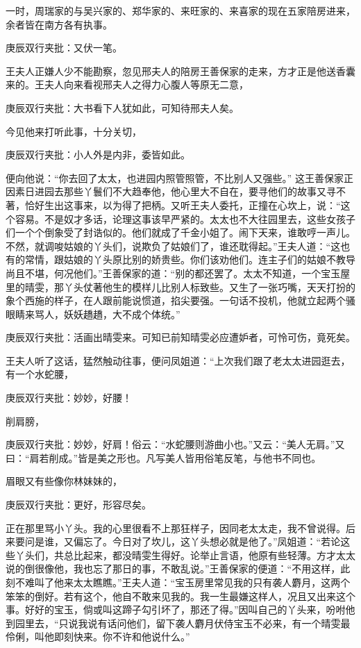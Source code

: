 \begin{parag}


    一时，周瑞家的与吴兴家的、郑华家的、来旺家的、来喜家的现在五家陪房进来，余者皆在南方各有执事。\begin{note}庚辰双行夹批：又伏一笔。\end{note}王夫人正嫌人少不能勘察，忽见邢夫人的陪房王善保家的走来，方才正是他送香囊来的。王夫人向来看视邢夫人之得力心腹人等原无二意，\begin{note}庚辰双行夹批：大书看下人犹如此，可知待邢夫人矣。\end{note}今见他来打听此事，十分关切，\begin{note}庚辰双行夹批：小人外是内非，委皆如此。\end{note}便向他说：“你去回了太太，也进园内照管照管，不比别人又强些。” 这王善保家正因素日进园去那些丫鬟们不大趋奉他，他心里大不自在，要寻他们的故事又寻不著，恰好生出这事来，以为得了把柄。又听王夫人委托，正撞在心坎上，说：“这个容易。不是奴才多话，论理这事该早严紧的。太太也不大往园里去，这些女孩子们一个个倒象受了封诰似的。他们就成了千金小姐了。闹下天来，谁敢哼一声儿。不然，就调唆姑娘的丫头们，说欺负了姑娘们了，谁还耽得起。”王夫人道：“这也有的常情，跟姑娘的丫头原比别的娇贵些。你们该劝他们。连主子们的姑娘不教导尚且不堪，何况他们。”王善保家的道：“别的都还罢了。太太不知道，一个宝玉屋里的晴雯，那丫头仗著他生的模样儿比别人标致些。又生了一张巧嘴，天天打扮的象个西施的样子，在人跟前能说惯道，掐尖要强。一句话不投机，他就立起两个骚眼睛来骂人，妖妖趫趫，大不成个体统。”\begin{note}庚辰双行夹批：活画出晴雯来。可知已前知晴雯必应遭妒者，可怜可伤，竟死矣。\end{note}王夫人听了这话，猛然触动往事，便问凤姐道：“上次我们跟了老太太进园逛去，有一个水蛇腰，\begin{note}庚辰双行夹批：妙妙，好腰！\end{note}削肩膀，\begin{note}庚辰双行夹批：妙妙，好肩！俗云：“水蛇腰则游曲小也。”又云：“美人无肩。”又曰：“肩若削成。”皆是美之形也。凡写美人皆用俗笔反笔，与他书不同也。\end{note}眉眼又有些像你林妹妹的，\begin{note}庚辰双行夹批：更好，形容尽矣。\end{note}正在那里骂小丫头。我的心里很看不上那狂样子，因同老太太走，我不曾说得。后来要问是谁，又偏忘了。今日对了坎儿，这丫头想必就是他了。”凤姐道：“若论这些丫头们，共总比起来，都没晴雯生得好。论举止言语，他原有些轻薄。方才太太说的倒很像他，我也忘了那日的事，不敢乱说。”王善保家的便道：“不用这样，此刻不难叫了他来太太瞧瞧。”王夫人道：“宝玉房里常见我的只有袭人麝月，这两个笨笨的倒好。若有这个，他自不敢来见我的。我一生最嫌这样人，况且又出来这个事。好好的宝玉，倘或叫这蹄子勾引坏了，那还了得。”因叫自己的丫头来，吩咐他到园里去，“只说我说有话问他们，留下袭人麝月伏侍宝玉不必来，有一个晴雯最伶俐，叫他即刻快来。你不许和他说什么。”
\end{parag}



